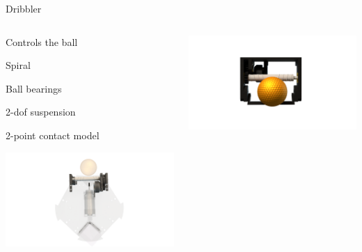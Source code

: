 
\begin{frame}{Dribbler}

    \begin{columns}[T]
        \begin{column}{0.5\textwidth}
        
            \vspace{-0.2cm}

            Controls the ball

            Spiral

            Ball bearings

            2-\acf{dof} suspension

            2-point contact model

            \vspace{1cm}
    
            \begin{adjustbox}{scale=1.3,center,margin={-1cm,3cm,2cm,0cm}}
                \includegraphics[width=1\textwidth]{image/png/dribbler_render.png}
            \end{adjustbox}
            
        \end{column}
        \begin{column}{0.5\textwidth}

            \begin{adjustbox}{scale=1.5,center,margin={-1cm,3cm,2cm,0cm}}
                \includegraphics[width=1\textwidth]{image/png/dribbler_render_front.png}
            \end{adjustbox}


\end{column}
\end{columns}
\end{frame}
